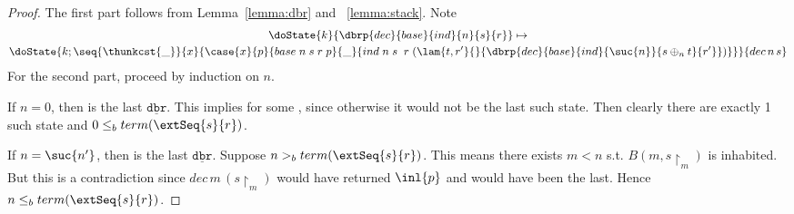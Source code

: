 \begin{proof}
  The first part follows from Lemma~\ref{lemma:dbr} and ~\ref{lemma:stack}.
  Note 
  \begin{gather*}
  \doState{k}{\dbrp{dec}{base}{ind}{n}{s}{r}} \mapsto \\
  \doState{k; \seq{\thunkcst{\_}}{x}{\case{x}{p}{base\;n\;s\;r\;p}{\_}{ind\;n\;s\;\;r\;(\lam{t,r'}{}{\dbrp{dec}{base}{ind}{\suc{n}}{s\oplus_n t}{r'}})}
}}{dec\,n\,s}
  \end{gather*}
  For the second part, proceed by induction on $n$. 
  
  If $n = 0$, 
  then  is the last 
  $\underline{\mathtt{dbr}}$. This implies  
  for some , 
  since otherwise it would not be the last such state. 
  Then clearly there are exactly 1 such state and 
  $0 \le_b term(\extSeq{s}{r})$.

  If $n = \suc{n'}$, then
   is the last 
  $\underline{\mathtt{dbr}}$. Suppose $n >_b term(\extSeq{s}{r})$.
  This means there exists $m < n$ s.t. $B(m,s\restriction_m)$ is inhabited.
  But this is a contradiction since $dec\,m\,(s\restriction_m)$ would have 
  returned $\inl{p}$ and 
   would have been
  the last. Hence $n \le_b term(\extSeq{s}{r})$. 
\end{proof}

